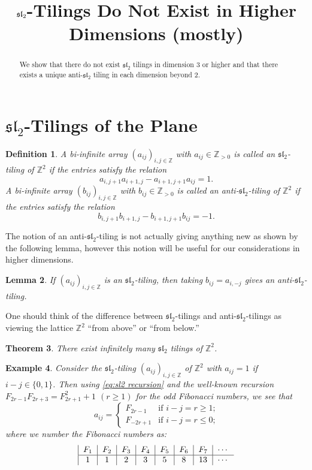 \documentclass{amsart}
\title{$\fsl_2$-Tilings Do Not Exist in Higher Dimensions (mostly)}
\newtheorem{theorem}{Theorem}
\newtheorem{definition}[theorem]{Definition}
\newtheorem{example}[theorem]{Example}
\newtheorem{lemma}[theorem]{Lemma}
\newcommand{\fsl}{\mathfrak{sl}}
\newcommand{\ZZ}{\mathbb{Z}}
\begin{document}
  \begin{abstract}
    We show that there do not exist $\fsl_2$ tilings in dimension 3 or higher and that there exists a unique anti-$\fsl_2$ tiling in each dimension beyond 2.
  \end{abstract}
  \maketitle

  \section{$\fsl_2$-Tilings of the Plane}
    \begin{definition}
      A bi-infinite array $(a_{ij})_{i,j\in\ZZ}$ with $a_{ij}\in\ZZ_{>0}$ is called an \emph{$\fsl_2$-tiling of $\ZZ^2$} if the entries satisfy the relation
      \begin{equation}\label{eq:sl2 recursion}
        a_{i,j+1}a_{i+1,j}-a_{i+1,j+1}a_{ij}=1.
      \end{equation}
      A bi-infinite array $(b_{ij})_{i,j\in\ZZ}$ with $b_{ij}\in\ZZ_{>0}$  is called an \emph{anti-$\fsl_2$-tiling of $\ZZ^2$} if the entries satisfy the relation
      \begin{equation}\label{eq:anti-sl2 recursion}
        b_{i,j+1}b_{i+1,j}-b_{i+1,j+1}b_{ij}=-1.
      \end{equation}
    \end{definition}
    The notion of an anti-$\fsl_2$-tiling is not actually giving anything new as shown by the following lemma, however this notion will be useful for our considerations in higher dimensions.
    \begin{lemma}
      If $(a_{ij})_{i,j\in\ZZ}$ is an $\fsl_2$-tiling, then taking $b_{ij}=a_{i,-j}$ gives an anti-$\fsl_2$-tiling.
    \end{lemma}
    One should think of the difference between $\fsl_2$-tilings and anti-$\fsl_2$-tilings as viewing the lattice $\ZZ^2$ ``from above'' or ``from below.''
    \begin{theorem}
      There exist infinitely many $\fsl_2$ tilings of $\ZZ^2$.
    \end{theorem}

    \begin{example}\label{ex:Fibonacci}
      Consider the $\fsl_2$-tiling $(a_{ij})_{i,j\in\ZZ}$ of $\ZZ^2$ with $a_{ij}=1$ if $i-j\in\{0,1\}$.  Then using \eqref{eq:sl2 recursion} and the well-known recursion $F_{2r-1}F_{2r+3}=F_{2r+1}^2+1$ $(r\ge1)$ for the odd Fibonacci numbers, we see that
      \[a_{ij}=\begin{cases}F_{2r-1} & \text{if $i-j=r\ge1$;}\\F_{-2r+1} & \text{if $i-j=r\le0$;}\end{cases}\]
      where we number the Fibonacci numbers as:
      \[\begin{tabular}{|c|c|c|c|c|c|c|c} $F_1$ & $F_2$ & $F_3$ & $F_4$ & $F_5$ & $F_6$ & $F_7$ & $\cdots$\\\hline 1 & 1 & 2 & 3 & 5 & 8 & 13 & $\cdots$\end{tabular}\]
    \end{example}
\end{document}

